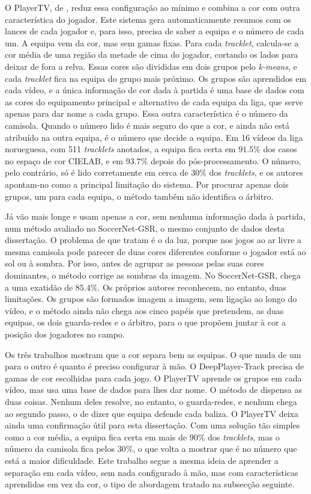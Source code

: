 O PlayerTV, de \citet{solberg2024playertv}, reduz essa configuração ao mínimo e combina a cor com outra característica do jogador. Este sistema gera automaticamente resumos com os lances de cada jogador e, para isso, precisa de saber a equipa e o número de cada um. A equipa vem da cor, mas sem gamas fixas. Para cada \emph{tracklet}, calcula-se a cor média de uma região da metade de cima do jogador, cortando os lados para deixar de fora a relva. Essas cores são divididas em dois grupos pelo \emph{k-means}, e cada \emph{tracklet} fica na equipa do grupo mais próximo. Os grupos são aprendidos em cada vídeo, e a única informação de cor dada à partida é uma base de dados com as cores do equipamento principal e alternativo de cada equipa da liga, que serve apenas para dar nome a cada grupo. Essa outra característica é o número da camisola. Quando o número lido é mais seguro do que a cor, e ainda não está atribuído na outra equipa, é o número que decide a equipa. Em 16 vídeos da liga norueguesa, com 511 \emph{tracklets} anotados, a equipa fica certa em $91{.}5\%$ dos casos no espaço de cor CIELAB, e em $93{.}7\%$ depois do pós-processamento. O número, pelo contrário, só é lido corretamente em cerca de $30\%$ dos \emph{tracklets}, e os autores apontam-no como a principal limitação do sistema. Por procurar apenas dois grupos, um para cada equipa, o método também não identifica o árbitro.

Já \citet{pan2024unsupervised} vão mais longe e usam apenas a cor, sem nenhuma informação dada à partida, num método avaliado no SoccerNet-GSR, o mesmo conjunto de dados desta dissertação. O problema de que tratam é o da luz, porque nos jogos ao ar livre a mesma camisola pode parecer de duas cores diferentes conforme o jogador está ao sol ou à sombra. Por isso, antes de agrupar as pessoas pelas suas cores dominantes, o método corrige as sombras da imagem. No SoccerNet-GSR, chega a uma exatidão de $85{.}4\%$. Os próprios autores reconhecem, no entanto, duas limitações. Os grupos são formados imagem a imagem, sem ligação ao longo do vídeo, e o método ainda não chega aos cinco papéis que pretendem, as duas equipas, os dois guarda-redes e o árbitro, para o que propõem juntar à cor a posição dos jogadores no campo.

Os três trabalhos mostram que a cor separa bem as equipas. O que muda de um para o outro é quanto é preciso configurar à mão. O DeepPlayer-Track precisa de gamas de cor escolhidas para cada jogo. O PlayerTV aprende os grupos em cada vídeo, mas usa uma base de dados para lhes dar nome. O método de \citet{pan2024unsupervised} dispensa as duas coisas. Nenhum deles resolve, no entanto, o guarda-redes, e nenhum chega ao segundo passo, o de dizer que equipa defende cada baliza. O PlayerTV deixa ainda uma confirmação útil para esta dissertação. Com uma solução tão simples como a cor média, a equipa fica certa em mais de $90\%$ dos \emph{tracklets}, mas o número da camisola fica pelos $30\%$, o que volta a mostrar que é no número que está a maior dificuldade. Este trabalho segue a mesma ideia de aprender a separação em cada vídeo, sem nada configurado à mão, mas com características aprendidas em vez da cor, o tipo de abordagem tratado na subsecção seguinte.

